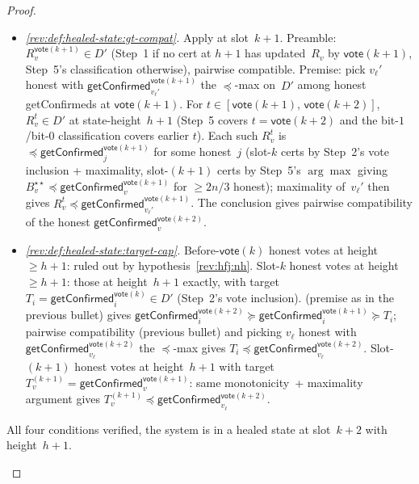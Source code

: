 \documentclass{article}
\newcommand{\vote}{\mathsf{vote}}
\newcommand{\getConfirmed}{\textsf{getConfirmed}\xspace}
\theoremstyle{plain}
\theoremstyle{definition}
\theoremstyle{remark}
\begin{document}
\begin{proof}
\begin{description}
\begin{description}
\begin{itemize}
  \item \emph{\ref{rev:def:healed-state:gt-compat}.}
  Apply  at slot~$k+1$. Preamble: $R_v^{\vote(k+1)} \in D'$ (Step~1 if no cert at $h+1$ has updated~$R_v$ by $\vote(k+1)$, Step~5's classification otherwise), pairwise compatible. Premise: pick $v_\ell'$ honest with $\getConfirmed_{v_\ell'}^{\vote(k+1)}$ the $\preceq$-max on~$D'$ among honest \getConfirmed{}s at $\vote(k+1)$. For $t \in [\vote(k+1),\, \vote(k+2)]$, $R_v^t \in D'$ at state-height~$h+1$ (Step~5 covers $t = \vote(k+2)$ and the bit-$1$/bit-$0$ classification covers earlier $t$). Each such $R_v^t$ is~$\preceq \getConfirmed_j^{\vote(k+1)}$ for some honest~$j$ (slot-$k$ certs by Step~2's vote inclusion + maximality, slot-$(k+1)$ certs by Step~5's $\arg\max$ giving $B^{\star\star}_v \preceq \getConfirmed_v^{\vote(k+1)}$ for $\geq 2n/3$ honest); maximality of~$v_\ell'$ then gives $R_v^t \preceq \getConfirmed_{v_\ell'}^{\vote(k+1)}$. The conclusion gives pairwise compatibility of the honest $\getConfirmed_v^{\vote(k+2)}$.

  \item \emph{\ref{rev:def:healed-state:target-cap}.}
  Before-$\vote(k)$ honest votes at height~$\geq h+1$: ruled out by hypothesis~\ref{rev:hfj:nh}. Slot-$k$ honest votes at height~$\geq h+1$: those at height~$h+1$ exactly, with target $T_i = \getConfirmed_i^{\vote(k)} \in D'$ (Step~2's vote inclusion).  (premise as in the previous bullet) gives $\getConfirmed_i^{\vote(k+2)} \succeq \getConfirmed_i^{\vote(k+1)} \succeq T_i$; pairwise compatibility (previous bullet) and picking $v_\ell$ honest with $\getConfirmed_{v_\ell}^{\vote(k+2)}$ the $\preceq$-max gives $T_i \preceq \getConfirmed_{v_\ell}^{\vote(k+2)}$. Slot-$(k+1)$ honest votes at height~$h+1$ with target $T_v^{(k+1)} = \getConfirmed_v^{\vote(k+1)}$: same monotonicity~+ maximality argument gives $T_v^{(k+1)} \preceq \getConfirmed_{v_\ell}^{\vote(k+2)}$.
\end{itemize}
All four conditions verified, the system is in a healed state at slot~$k+2$ with height~$h+1$.


\item[{Case 2.B: $\sigma[\getConfirmed_{v_*}^{\vote(k+1)}].h = h+2$ for some honest~$v_*$.}]\hfill

\begin{figure}[H]
\centering
{}
\end{figure}
\end{description}
\end{description}
\end{proof}
\end{document}
